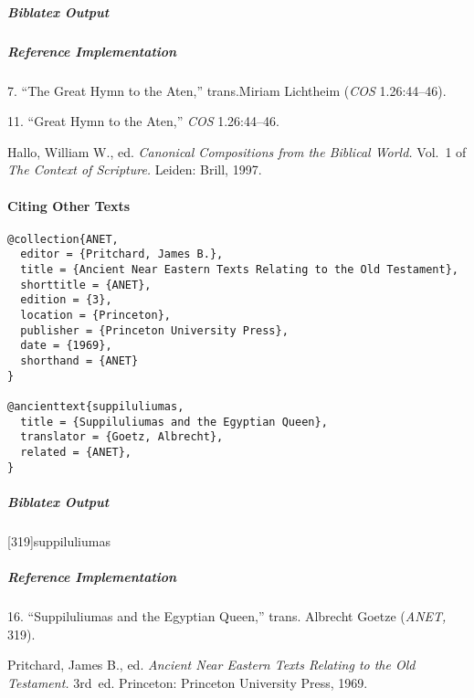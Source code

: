 \documentclass[a4paper]{article}
\newenvironment{biboutput}{%
  \subparagraph{Biblatex Output}
}{\color{black}}
\newenvironment{refimp}{%
  \subparagraph{Reference Implementation}
  \color{reference-colour}
  \rm
}{\par\color{black}}
\begin{document}
\begin{biboutput}
\end{biboutput}

\begin{refimp}
  \hspace*{\bibindent}7. “The Great Hymn to the Aten,” trans.\@ Miriam Lichtheim
  (\emph{COS} 1.26:44–46).

  \hspace*{\bibindent}11. “Great Hymn to the Aten,” \emph{COS} 1.26:44–46.

  \hangindent\bibindent Hallo, William W., ed. \emph{Canonical Compositions
  from the Biblical World.} Vol.~1 of \emph{The Context of Scripture.} Leiden:
  Brill, 1997.

\end{refimp}

\paragraph{Citing Other Texts}

\begin{lstlisting}
@collection{ANET,
  editor = {Pritchard, James B.},
  title = {Ancient Near Eastern Texts Relating to the Old Testament},
  shorttitle = {ANET},
  edition = {3},
  location = {Princeton},
  publisher = {Princeton University Press},
  date = {1969},
  shorthand = {ANET}
}

@ancienttext{suppiluliumas,
  title = {Suppiluliumas and the Egyptian Queen},
  translator = {Goetz, Albrecht},
  related = {ANET},
}
\end{lstlisting}

\begin{biboutput}
  [319]{suppiluliumas}
\end{biboutput}

\begin{refimp}
  \hspace*{\bibindent}16. “Suppiluliumas and the Egyptian Queen,” trans.\@
  Albrecht Goetze (\emph{ANET,} 319).

  \hangindent\bibindent Pritchard, James B., ed. \emph{Ancient Near Eastern
  Texts Relating to the Old Testament.} 3rd~ed. Princeton: Princeton
  University Press, 1969.

\end{refimp}
\end{document}

